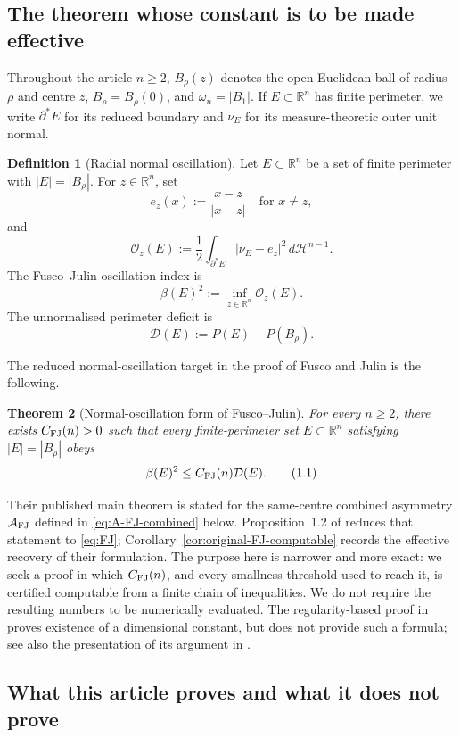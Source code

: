 \documentclass[11pt]{amsart}
\newtheorem{theorem}{Theorem}[section]
\theoremstyle{definition}
\newtheorem{definition}[theorem]{Definition}
\newcommand{\R}{\mathbb R}
\newcommand{\Hn}{\mathcal H^{n-1}}
\newcommand{\Per}{P}
\newcommand{\osc}{\mathcal O}
\newcommand{\Def}{\mathcal D}
\begin{document}
\subsection{The theorem whose constant is to be made effective}

Throughout the article \(n\ge2\), \(B_\rho(z)\) denotes the open Euclidean ball
of radius \(\rho\) and centre \(z\), \(B_\rho=B_\rho(0)\), and
\(\omega_n=|B_1|\).  If \(E\subset\R^n\) has finite perimeter, we write
\(\partial^*E\) for its reduced boundary and \(\nu_E\) for its
measure-theoretic outer unit normal.

\begin{definition}[Radial normal oscillation]\label{def:beta}
Let \(E\subset\R^n\) be a set of finite perimeter with
\(|E|=|B_\rho|\).  For \(z\in\R^n\), set
\[
   e_z(x):=\frac{x-z}{|x-z|}
   \quad\text{for }x\ne z,
\]
and
\[
   \osc_z(E):=
   \frac12\int_{\partial^*E}|\nu_E-e_z|^2\,d\Hn.
\]
The Fusco--Julin oscillation index is
\[
   \beta(E)^2:=\inf_{z\in\R^n}\osc_z(E).
\]
The unnormalised perimeter deficit is
\[
   \Def(E):=\Per(E)-\Per(B_\rho).
\]
\end{definition}

The reduced normal-oscillation target in the proof of Fusco and Julin
\cite{FJ} is the following.

\begin{theorem}[Normal-oscillation form of Fusco--Julin]\label{thm:FJ}
For every \(n\ge2\), there exists \(C_{\rm FJ}(n)>0\) such that every
finite-perimeter set \(E\subset\R^n\) satisfying \(|E|=|B_\rho|\) obeys
\[
   \beta(E)^2\le C_{\rm FJ}(n)\Def(E).
\tag{1.1}\label{eq:FJ}
\]
\end{theorem}

Their published main theorem is stated for the same-centre combined
asymmetry \(\mathcal A_{\rm FJ}\) defined in
\eqref{eq:A-FJ-combined} below.  Proposition~1.2 of \cite{FJ} reduces
that statement to \eqref{eq:FJ}; Corollary~\ref{cor:original-FJ-computable}
records the effective recovery of their formulation.
The purpose here is narrower and more exact:
we seek a proof in which \(C_{\rm FJ}(n)\), and every smallness threshold used
to reach it, is certified computable from a finite chain of inequalities.  We
do not require the resulting numbers to be numerically evaluated.  The regularity-based
proof in \cite{FJ} proves existence of a dimensional constant, but does not
provide such a formula; see also the presentation of its argument in
\cite[Section 5.3]{FuscoSurvey}.

\subsection{What this article proves and what it does not prove}
\end{document}
